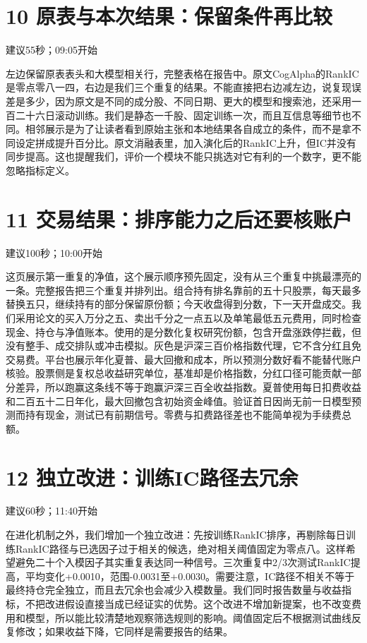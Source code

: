 \documentclass[UTF8,a4paper,11pt]{ctexart}
\begin{document}
\section*{\color{ink}10 原表与本次结果：保留条件再比较}
{\small\color{accent}建议55秒；09:05开始}\par
左边保留原表表头和大模型相关行，完整表格在报告中。原文CogAlpha的RankIC是零点零八一四，右边是我们三个重复的结果。不能直接把右边减左边，说复现误差是多少，因为原文是不同的成分股、不同日期、更大的模型和搜索池，还采用一百二十六日滚动训练。我们是静态一千股、固定训练一次，而且互信息等细节也不同。相邻展示是为了让读者看到原始主张和本地结果各自成立的条件，而不是拿不同设定拼成提升百分比。原文消融表里，加入演化后的RankIC上升，但IC并没有同步提高。这也提醒我们，评价一个模块不能只挑选对它有利的一个数字，更不能忽略指标定义。
\newpage
\section*{\color{ink}11 交易结果：排序能力之后还要核账户}
{\small\color{accent}建议100秒；10:00开始}\par
这页展示第一重复的净值，这个展示顺序预先固定，没有从三个重复中挑最漂亮的一条。完整报告把三个重复并排列出。组合持有排名靠前的五十只股票，每天最多替换五只，继续持有的部分保留原份额；今天收盘得到分数，下一天开盘成交。我们采用论文的买入万分之五、卖出千分之一点五以及单笔最低五元费用，同时检查现金、持仓与净值账本。使用的是分数化复权研究份额，包含开盘涨跌停拦截，但没有整手、成交排队或冲击模拟。灰色是沪深三百价格指数代理，它不含分红且免交易费。平台也展示年化夏普、最大回撤和成本，所以预测分数好看不能替代账户核验。股票侧是复权总收益研究单位，基准却是价格指数，分红口径可能贡献一部分差异，所以跑赢这条线不等于跑赢沪深三百全收益指数。夏普使用每日扣费收益和二百五十二日年化，最大回撤包含初始资金峰值。验证首日因尚无前一日模型预测而持有现金，测试已有前期信号。零费与扣费路径差也不能简单视为手续费总额。
\section*{\color{ink}12 独立改进：训练IC路径去冗余}
{\small\color{accent}建议60秒；11:40开始}\par
在进化机制之外，我们增加一个独立改进：先按训练RankIC排序，再剔除每日训练RankIC路径与已选因子过于相关的候选，绝对相关阈值固定为零点八。这样希望避免二十个入模因子其实重复表达同一种信号。三次重复中2/3次测试RankIC提高，平均变化+0.0010，范围-0.0031至+0.0030。需要注意，IC路径不相关不等于最终持仓完全独立，而且去冗余也会减少入模数量。我们同时报告数量与收益指标，不把改进假设直接当成已经证实的优势。这个改进不增加新提案，也不改变费用和模型，所以能比较清楚地观察筛选规则的影响。阈值固定后不根据测试曲线反复修改；如果收益下降，它同样是需要报告的结果。
\newpage
\end{document}
